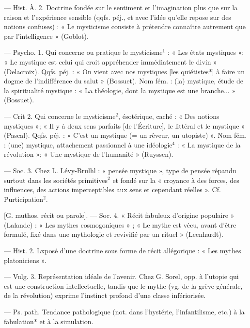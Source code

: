 \begin{itemize}[leftmargin=1cm, label=, itemsep=1pt]
— Hist. À. 2. Doctrine fondée
sur le sentiment et l'imagination
plus que sur la raison et l’expérience
sensible (qqfs. péj., et avec l’idée
qu’elle repose sur des notions confuses) : « Le mysticisme consiste à
prétendre connaître autrement que
par l'intelligence » (Goblot).

 — Psycho. 1. Qui concerne
ou pratique le mysticisme$^1$ : « Les
états mystiques »; « Le mystique est
celui qui croit appréhender immédiatement le divin » (Delacroix).
Qqfs. péj. : « On vient avec nos mystiques [les quiétistes*] à faire un
dogme de l'indifférence du salut »
(Bossuet). Nom fém. : (la) mystique,
étude de la spiritualité mystique :
« La théologie, dont la mystique est
une branche... » (Bossuet).

— Crit 2. Qui concerne le mysticisme$^2$, ésotérique, caché : « Des
notions mystiques »; « Il y à deux
sens parfaits [de l'Écriture], le littéral et le mystique » (Pascal).
Qqfs. péj. : « C'est un mystique
(= un rêveur, un utopiste) ». Nom
fém. : (une) mystique, attachement
passionnel à une idéologie$^4$ : « La
mystique de la révolution »; « Une
mystique de l'humanité » (Ruyssen).

— Soc. 3. Chez L. Lévy-Brulhl :
« pensée mystique », type de pensée
répandu surtout dans les sociétés
primitives$^2$ et fondé sur la « croyance
à des forces, des influences, des
actions imperceptibles aux sens et
cependant réelles ». Cf. Purticipation$^2$.

 [G. muthos, récit ou parole]. —
Soc. 4. « Récit fabuleux d’origine
populaire » (Lalande) : « Les mythes
cosmogoniques » ; « Le mythe est
vécu, avant d'être formulé, fixé
dans une mythologie et revivifié par
un rituel » (Leenhardt).

— Hist. 2. Lxposé d’une doctrine sous forme de récit allégorique :
« Les mythes platoniciens ».

— Vulg. 3. Représentation idéale
de l'avenir. Chez G. Sorel, opp. à
l'utopie qui est une construction
intellectuelle, tandis que le mythe
(vg. de la grève générale, de la révolution) exprime l'instinct profond
d’une classe infériorisée.

 — Ps. path. Tendance
pathologique (not. dans l’hystérie,
l'infantilisme, etc.) à la fabulation*
et à la simulation.

	\end{itemize}
